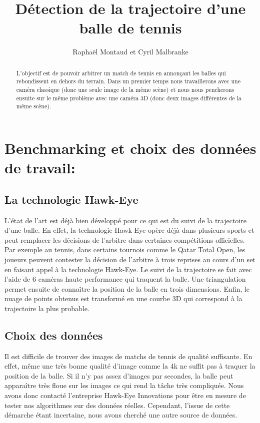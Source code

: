 \documentclass[a4paper]{article}
\title{Détection de la trajectoire d'une balle de tennis}
\author{Raphaël Montaud et Cyril Malbranke}
\begin{document}
\maketitle

\begin{abstract}
	L'objectif est de pouvoir arbitrer un match de tennis en annonçant les balles qui rebondissent en dehors du terrain. Dans un premier temps nous travaillerons avec une caméra classique (donc une seule image de la même scène) et nous nous pencherons ensuite sur le même problème avec une caméra 3D (donc deux images différentes de la même scène).
\end{abstract}


\section{Benchmarking et choix des données de travail:}

\subsection{La technologie Hawk-Eye}
L'état de l'art est déjà bien développé pour ce qui est du suivi de la trajectoire d'une balle. En effet, la technologie Hawk-Eye opère déjà dans plusieurs sports et peut remplacer les décisions de l'arbitre dans certaines compétitions officielles. Par exemple au tennis, dans certains tournois comme le Qatar Total Open, les joueurs peuvent contester la décision de l'arbitre à trois reprises au cours d'un set en faisant appel à la technologie Hawk-Eye.
Le suivi de la trajectoire se fait avec l'aide de 6 caméras haute performance qui traquent la balle. Une triangulation permet ensuite de connaître la position de la balle en trois dimensions. Enfin, le nuage de points obtenus est transformé en une courbe 3D qui correspond à la trajectoire la plus probable.

\subsection{Choix des données}
Il est difficile de trouver des images de matchs de tennis de qualité suffisante. En effet, même une très bonne qualité d'image comme la 4k ne suffit pas à traquer la position de la balle. Si il n'y pas assez d'images par secondes, la balle peut apparaître très floue sur les images ce qui rend la tâche très compliquée. Nous avons donc contacté l'entreprise Hawk-Eye Innovations pour être en mesure de tester nos algorithmes sur des données réelles. Cependant, l'issue de cette démarche étant incertaine, nous avons cherché une autre source de données.
\end{document}
